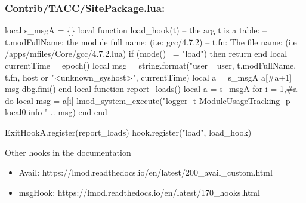 \documentclass{beamer}
\begin{document}
\begin{frame}[fragile]
  \frametitle{Contrib/TACC/SitePackage.lua: }
    {\tiny
\begin{semiverbatim}
local s\_msgA = \{\}
local function load_hook(t)
   -- the arg t is a table:
   --     t.modFullName:  the module full name: (i.e: gcc/4.7.2)
   --     t.fn:           The file name: (i.e /apps/mfiles/Core/gcc/4.7.2.lua)
   if (mode() ~= "load") then return end
   local currentTime = epoch()
   local msg         = string.format("user=%
                                     user, t.modFullName, t.fn, 
                                     host or "<unknown_syshost>", currentTime)
   local a           = s\_msgA
   a[#a+1]           = msg
   dbg.fini()
end
local function report_loads()
   local a = s\_msgA
   for i = 1,#a do
      local msg = a[i]
      lmod_system_execute("logger -t ModuleUsageTracking -p local0.info " .. msg)
   end
end

ExitHookA.register(report_loads)
hook.register("load",           load_hook)
\end{semiverbatim}
    }
\end{frame}


\begin{frame}{Other hooks in the documentation}
  \begin{itemize}
    \item Avail: https://lmod.readthedocs.io/en/latest/200\_avail\_custom.html
    \item msgHook: https://lmod.readthedocs.io/en/latest/170\_hooks.html
  \end{itemize}
\end{frame}
\end{document}
